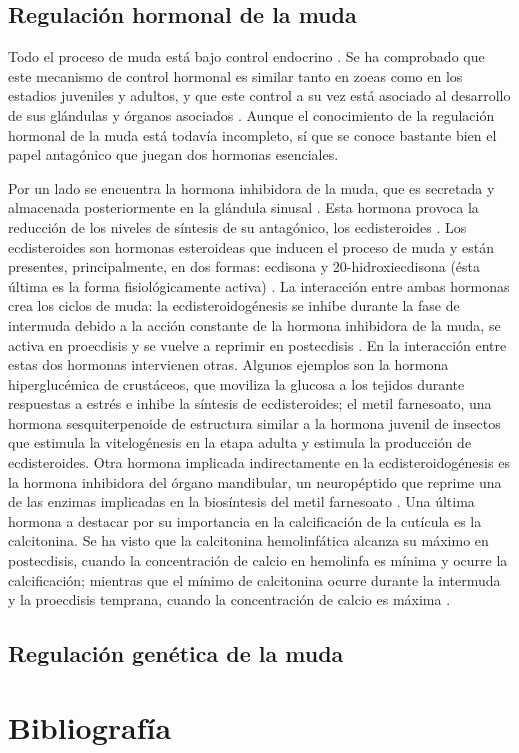 \documentclass[a4paper]{article}
\begin{document}
\subsection{Regulación hormonal de la muda}
Todo el proceso de muda está bajo control endocrino \citep{Techa2013}. Se ha comprobado que este mecanismo de control hormonal es similar tanto en zoeas como en los estadios juveniles y adultos, y que este control a su vez está asociado al desarrollo de sus glándulas y órganos asociados \citep{Webster1991}. Aunque el conocimiento de la regulación hormonal de la muda está todavía incompleto, sí que se conoce bastante bien el papel antagónico que juegan dos hormonas esenciales.\par Por un lado se encuentra la hormona inhibidora de la muda, que es secretada y almacenada posteriormente en la glándula sinusal \citep{Hartnoll2001}. Esta hormona provoca la reducción de los niveles de síntesis de su antagónico, los ecdisteroides \citep{Anger2001, Hartnoll2001}. Los ecdisteroides son hormonas esteroideas que inducen el proceso de muda y están presentes, principalmente, en dos formas: ecdisona y 20-hidroxiecdisona (ésta última es la forma fisiológicamente activa) \citep{Das2016}. La interacción entre ambas hormonas crea los ciclos de muda: la ecdisteroidogénesis se inhibe durante la fase de intermuda debido a la acción constante de la hormona inhibidora de la muda, se activa en proecdisis y se vuelve a reprimir en postecdisis \citep{Zou2004}. En la interacción entre estas dos hormonas intervienen otras. Algunos ejemplos son la hormona hiperglucémica de crustáceos, que moviliza la glucosa a los tejidos durante respuestas a estrés \citep{Hartnoll2001} e inhibe la síntesis de ecdisteroides; el metil farnesoato, una hormona sesquiterpenoide de estructura similar a la hormona juvenil de insectos que estimula la vitelogénesis en la etapa adulta \citep{Hartnoll2001} y estimula la producción de ecdisteroides. Otra hormona implicada indirectamente en la ecdisteroidogénesis es la hormona inhibidora del órgano mandibular, un neuropéptido que reprime una de las enzimas implicadas en la biosíntesis del metil farnesoato \citep{Wainwright1996}. Una última hormona a destacar por su importancia en la calcificación de la cutícula es la calcitonina. Se ha visto que la calcitonina hemolinfática alcanza su máximo en postecdisis, cuando la concentración de calcio en hemolinfa es mínima y ocurre la calcificación; mientras que el mínimo de calcitonina ocurre durante la intermuda y la proecdisis temprana, cuando la concentración de calcio es máxima \citep{Arlot1986}.

\subsection{Regulación genética de la muda}


\section{Bibliografía}

\end{document}
